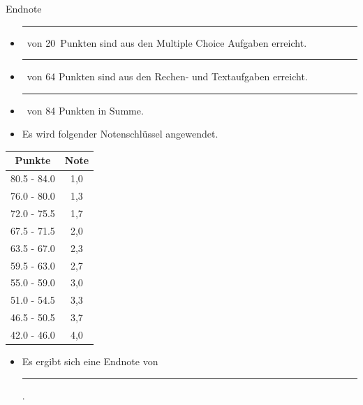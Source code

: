 \documentclass[a4paper, 9pt]{scrartcl}\usepackage[]{graphicx}\usepackage[]{xcolor}
\begin{document}
\begin{graybox}{Endnote}
  \vspace{1Ex}
  \begin{itemize}
  \item[] \rule[0ex]{3em}{.4pt}\, von 20\, Punkten sind aus den Multiple
    Choice Aufgaben erreicht.
  \item[] \rule[0ex]{3em}{.4pt}\, von 64 Punkten sind aus den Rechen- und
    Textaufgaben erreicht. 
  \item[] \rule[0ex]{3em}{.4pt}\, von 84 Punkten in Summe.
  \item[] Es wird folgender Notenschlüssel angewendet.   
  \end{itemize}
  \vspace{1ex}
\begin{center}
  \begin{tabular}[c]{cc}
    \toprule
    \textbf{Punkte}	&	\textbf{Note}	\\
    \midrule
    80.5 - 84.0	&	1,0	\\
    76.0 - 80.0	&	1,3	\\
    72.0 - 75.5	&	1,7	\\
    67.5 - 71.5	&	2,0	\\
    63.5 - 67.0	&	2,3	\\
    59.5 - 63.0	&	2,7	\\
    55.0 - 59.0	&	3,0	\\
    51.0 - 54.5	&	3,3	\\
    46.5 - 50.5	&	3,7	\\
    42.0 - 46.0	&	4,0	\\
    \bottomrule
  \end{tabular}
\end{center}
  \vspace{1ex}
\begin{itemize}
\item[] Es ergibt sich eine Endnote von \rule[0ex]{4em}{.4pt}.
\end{itemize}
  \vspace{1Ex}
\end{graybox}

\newpage
\end{document}
